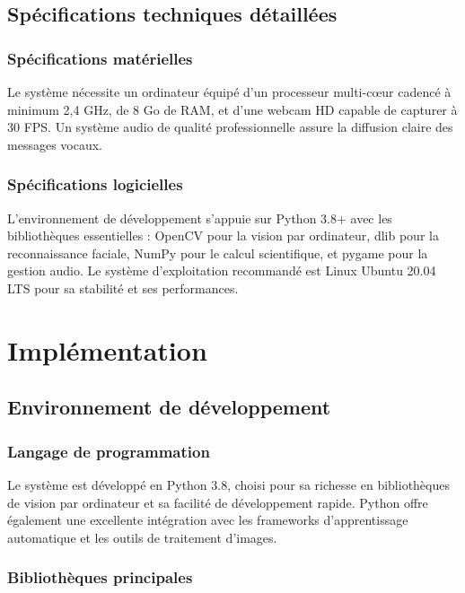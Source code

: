 \documentclass[12pt,a4paper]{article}
\begin{document}
\subsection{Spécifications techniques détaillées}

\subsubsection{Spécifications matérielles}

Le système nécessite un ordinateur équipé d'un processeur multi-cœur cadencé à minimum 2,4 GHz, de 8 Go de RAM, et d'une webcam HD capable de capturer à 30 FPS. Un système audio de qualité professionnelle assure la diffusion claire des messages vocaux.

\subsubsection{Spécifications logicielles}

L'environnement de développement s'appuie sur Python 3.8+ avec les bibliothèques essentielles : OpenCV pour la vision par ordinateur, dlib pour la reconnaissance faciale, NumPy pour le calcul scientifique, et pygame pour la gestion audio. Le système d'exploitation recommandé est Linux Ubuntu 20.04 LTS pour sa stabilité et ses performances.

\newpage

\section{Implémentation}

\subsection{Environnement de développement}

\subsubsection{Langage de programmation}

Le système est développé en Python 3.8, choisi pour sa richesse en bibliothèques de vision par ordinateur et sa facilité de développement rapide. Python offre également une excellente intégration avec les frameworks d'apprentissage automatique et les outils de traitement d'images.

\subsubsection{Bibliothèques principales}
\end{document}
